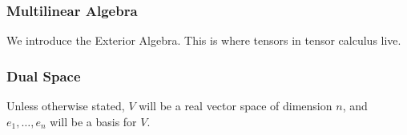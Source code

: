 \begin{frame}
  \frametitle{Multilinear Algebra}
  We introduce the Exterior Algebra. This is where tensors in tensor calculus
  live.
\end{frame}
\begin{frame}
  \frametitle{Dual Space}
  \begin{block}
    Unless otherwise stated, $V$ will be a real vector
    space of dimension $n$, and $e_1, \dots, e_n$ will be
    a basis for $V$.
  \end{block}
\end{frame}
